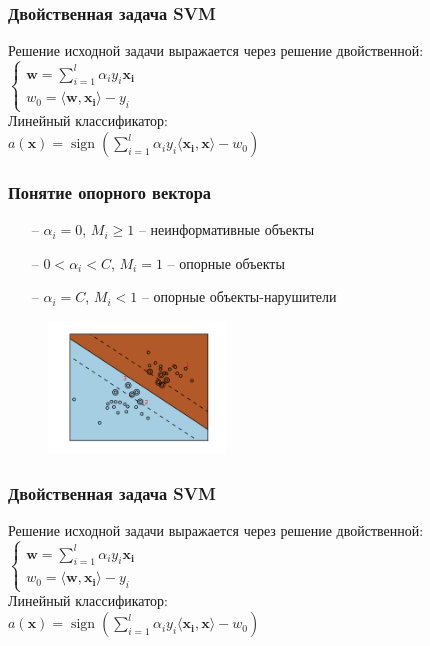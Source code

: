 \documentclass[12pt]{beamer}
\DeclareMathOperator{\sign}{sign}
\begin{document}
\begin{frame}\frametitle{Двойственная задача SVM}

Решение исходной задачи выражается через решение двойственной:\\
$\begin{cases}
\mathbf{w} = \sum\limits_{i = 1}^l \alpha_iy_i\mathbf{x_i}\\
w_0 = \langle \mathbf{w}, \mathbf{x_i} \rangle - y_i
\end{cases}$\\
\vspace{5mm}
Линейный классификатор:\\
$a(\mathbf{x}) = \sign(\sum\limits_{i=1}^l \alpha_iy_i \langle \mathbf{x_i}, \mathbf{x} \rangle - w_0)$

\end{frame}

\begin{frame}\frametitle{Понятие опорного вектора}
\begin{itemize}
\item[--] $\alpha_i = 0$, $M_i \geq 1$ -- неинформативные объекты
\item[--] $0 < \alpha_i < C$, $M_i = 1$ -- опорные объекты
\item[--] $\alpha_i = C$, $M_i < 1$ -- опорные объекты-нарушители
\end{itemize}

\begin{figure}[htbp]
  \includegraphics[height=100pt, keepaspectratio = true]{images/classification}   
\end{figure}

\end{frame}

\begin{frame}\frametitle{Двойственная задача SVM}

Решение исходной задачи выражается через решение двойственной:\\
$\begin{cases}
\mathbf{w} = \sum\limits_{i = 1}^l \alpha_iy_i\mathbf{x_i}\\
w_0 = \langle \mathbf{w}, \mathbf{x_i} \rangle - y_i
\end{cases}$\\
\vspace{5mm}
Линейный классификатор:\\
$a(\mathbf{x}) = \sign(\sum\limits_{i=1}^l \alpha_iy_i \langle \mathbf{x_i}, \mathbf{x} \rangle - w_0)$

\end{frame}
\end{document}
